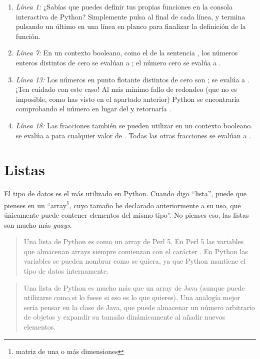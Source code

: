 \begin{enumerate}

\item \emph{Línea 1:} ¿Sabías que puedes definir tus propias funciones en la consola interactiva de Python? Simplemente pulsa  al final de cada línea, y termina pulsando un último  en una línea en planco para finalizar la definición de la función.

\item \emph{Línea 7:} En un contexto booleano, como el de la sentencia , los números enteros distintos de cero se evalúan a ; el número cero se evalúa a .

\item \emph{Línea 13:} Los números en punto flotante distintos de cero son ;  se evalúa a . ¡Ten cuidado con este caso! Al más mínimo fallo de redondeo (que no es imposible, como has visto en el apartado anterior) Python se encontraría comprobando el número  en lugar del  y retornaría . 

\item \emph{Línea 18:} Las fracciones también se pueden utilizar en un contexto booleano.  se evalúa a  para cualquier valor de . Todas las otras fracciones se evalúan a .

\end{enumerate}

\section{Listas}

El tipo de datos  es el más utilizado en Python. Cuando digo ``lista'', puede que pienses en un ``array\footnote{matriz de una o más dimensiones}, cuyo tamaño he declarado anteriormente a su uso, que únicamente puede contener elementos del mismo tipo''. No pienses eso, las listas son mucho más \emph{guays}.

\begin{quote}
Una lista de Python es como un array de Perl 5. En Perl 5 las variables que almacenan arrays siempre comienzan con el carácter . En Python las variables se pueden nombrar como se quiera, ya que Python mantiene el tipo de datos internamente.
\end{quote}

\begin{quote}
Una lista de Python es mucho más que un array de Java (aunque puede utilizarse como si lo fuese si eso es lo que quieres). Una analogía mejor sería pensar en la clase  de Java, que puede almacenar un número arbitrario de objetos y expandir su tamaño dinámicamente al añadir nuevos elementos.
\end{quote}

